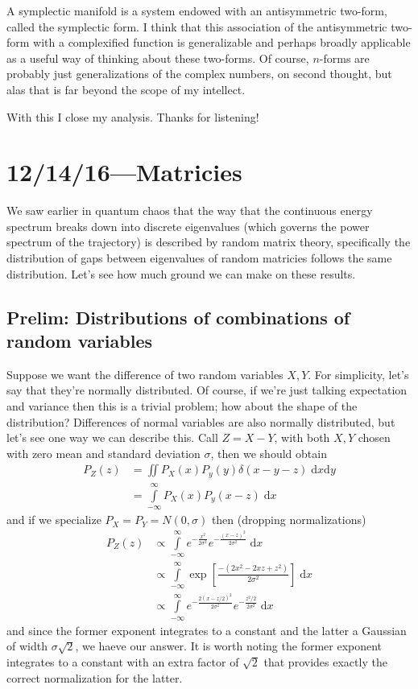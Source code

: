 \documentclass[12pt]{report}
\begin{document}
A symplectic manifold is a system endowed with an antisymmetric two-form, called
the symplectic form. I think that this association of the antisymmetric two-form
with a complexified function is generalizable and perhaps broadly applicable as
a useful way of thinking about these two-forms. Of course, $n$-forms are
probably just generalizations of the complex numbers, on second thought, but
alas that is far beyond the scope of my intellect.

With this I close my analysis. Thanks for listening!

\chapter{12/14/16---Matricies}

We saw earlier in quantum chaos that the way that the continuous energy spectrum
breaks down into discrete eigenvalues (which governs the power spectrum of the
trajectory) is described by random matrix theory, specifically the distribution
of gaps between eigenvalues of random matricies follows the same distribution.
Let's see how much ground we can make on these results.

\section{Prelim: Distributions of combinations of random variables}

Suppose we want the difference of two random variables $X, Y$. For simplicity,
let's say that they're normally distributed. Of course, if we're just talking
expectation and variance then this is a trivial problem; how about the shape of
the distribution? Differences of normal variables are also normally distributed,
but let's see one way we can describe this. Call $Z = X - Y$, with both $X,Y$
chosen with zero mean and standard deviation $\sigma$, then we should obtain
\begin{align}
    P_Z(z) &= \iint P_X(x) P_y(y) \delta(x - y - z)\;\mathrm{d}x\mathrm{d}y\\
    &= \int\limits_{-\infty}^{\infty}P_X(x)P_y(x-z)\;\mathrm{d}x
\end{align}
and if we specialize $P_X = P_Y = N(0, \sigma)$ then (dropping normalizations)
\begin{align}
    P_Z(z) &\propto \int\limits_{-\infty}^{\infty}e^{-\frac{x^2}{2\sigma^2}}
        e^{-\frac{(x-z)^2}{2\sigma^2}}\;\mathrm{d}x\\
    &\propto \int\limits_{-\infty}^{\infty}
        \exp\left[ \frac{-(2x^2 - 2xz + z^2)}{2\sigma^2} \right]\;\mathrm{d}x\\
    &\propto \int\limits_{-\infty}^{\infty}e^{-\frac{2(x - z/2)^2}{2\sigma^2}}
        e^{-\frac{z^2/2}{2\sigma^2}}\;\mathrm{d}x
\end{align}
and since the former exponent integrates to a constant and the latter a Gaussian
of width $\sigma \sqrt{2}$, we haeve our answer. It is worth noting the former
exponent integrates to a constant with an extra factor of $\sqrt{2}$ that
provides exactly the correct normalization for the latter.
\end{document}
